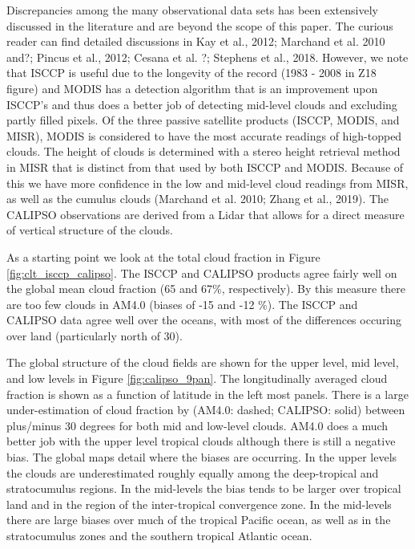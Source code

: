 \documentclass[11pt]{article}   	%
\begin{document}
Discrepancies among the many observational data sets has been extensively discussed in the literature and are 
beyond the scope of this paper.  The curious reader can find detailed discussions in Kay et al., 2012; 
Marchand et al. 2010 and?; Pincus et al., 2012; Cesana et al. ?; Stephens et al., 2018.  However, we note that ISCCP is useful due to 
the longevity of the record (1983 - 2008 in Z18 figure) and MODIS has a detection algorithm that is an improvement upon ISCCP's and
thus does a better job of detecting mid-level clouds and excluding partly filled pixels.   Of the three passive satellite products 
(ISCCP, MODIS, and MISR), MODIS is considered to have the most accurate readings of high-topped clouds.  
The height of clouds is determined with a stereo height retrieval method in MISR that is distinct from that used by
both ISCCP and MODIS.  Because of this we have more confidence in the low and mid-level cloud readings 
from MISR, as well as the cumulus clouds (Marchand et al. 2010; Zhang et al., 2019).   The CALIPSO observations
are derived from a Lidar that allows for a direct measure of vertical structure of the clouds.  


As a starting point we look at the total cloud fraction in Figure \ref{fig:clt_isccp_calipso}.  The ISCCP and 
CALIPSO products agree fairly well on the 
global mean cloud fraction (65 and 67\%, respectively).   By this measure there are too few clouds in AM4.0 
(biases of -15 and -12 \%).   The ISCCP and CALIPSO data agree well over the oceans, with most of the differences
occuring over land (particularly north of 30).    

The global structure of the cloud fields are shown for the upper level, mid level, and low levels in 
Figure \ref{fig:calipso_9pan}.  The longitudinally averaged cloud fraction is shown as a function of latitude in the 
left most panels.  There is a large under-estimation of cloud fraction by (AM4.0: dashed; CALIPSO: solid) between plus/minus 30 
degrees for both mid and low-level clouds.   AM4.0 does a much better job with the upper level tropical clouds 
although there is still a negative bias.   The global maps detail where the biases are occurring.  In the upper 
levels the clouds are underestimated roughly equally among the deep-tropical and stratocumulus regions.  In the
mid-levels the bias tends to be larger over tropical land and in the region of the inter-tropical convergence zone.  
In the mid-levels there are large biases over much of the tropical Pacific ocean, as well as in the stratocumulus
zones and the southern tropical Atlantic ocean.  
\end{document}
